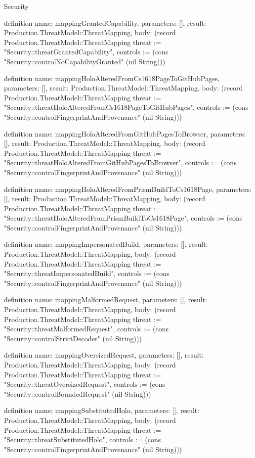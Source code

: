 \begin{lexlean}{Security}
\begin{semanticmodule}
definition{
  name: mappingGrantedCapability,
  parameters: [],
  result: Production.ThreatModel::ThreatMapping,
  body: (record Production.ThreatModel::ThreatMapping {threat := "Security::threatGrantedCapability", controls := (cons "Security::controlNoCapabilityGranted" (nil String))})
}

definition{
  name: mappingHoloAlteredFromCs1618PageToGitHubPages,
  parameters: [],
  result: Production.ThreatModel::ThreatMapping,
  body: (record Production.ThreatModel::ThreatMapping {threat := "Security::threatHoloAlteredFromCs1618PageToGitHubPages", controls := (cons "Security::controlFingerprintAndProvenance" (nil String))})
}

definition{
  name: mappingHoloAlteredFromGitHubPagesToBrowser,
  parameters: [],
  result: Production.ThreatModel::ThreatMapping,
  body: (record Production.ThreatModel::ThreatMapping {threat := "Security::threatHoloAlteredFromGitHubPagesToBrowser", controls := (cons "Security::controlFingerprintAndProvenance" (nil String))})
}

definition{
  name: mappingHoloAlteredFromPrismBuildToCs1618Page,
  parameters: [],
  result: Production.ThreatModel::ThreatMapping,
  body: (record Production.ThreatModel::ThreatMapping {threat := "Security::threatHoloAlteredFromPrismBuildToCs1618Page", controls := (cons "Security::controlFingerprintAndProvenance" (nil String))})
}

definition{
  name: mappingImpersonatedBuild,
  parameters: [],
  result: Production.ThreatModel::ThreatMapping,
  body: (record Production.ThreatModel::ThreatMapping {threat := "Security::threatImpersonatedBuild", controls := (cons "Security::controlFingerprintAndProvenance" (nil String))})
}

definition{
  name: mappingMalformedRequest,
  parameters: [],
  result: Production.ThreatModel::ThreatMapping,
  body: (record Production.ThreatModel::ThreatMapping {threat := "Security::threatMalformedRequest", controls := (cons "Security::controlStrictDecoder" (nil String))})
}

definition{
  name: mappingOversizedRequest,
  parameters: [],
  result: Production.ThreatModel::ThreatMapping,
  body: (record Production.ThreatModel::ThreatMapping {threat := "Security::threatOversizedRequest", controls := (cons "Security::controlBoundedRequest" (nil String))})
}

definition{
  name: mappingSubstitutedHolo,
  parameters: [],
  result: Production.ThreatModel::ThreatMapping,
  body: (record Production.ThreatModel::ThreatMapping {threat := "Security::threatSubstitutedHolo", controls := (cons "Security::controlFingerprintAndProvenance" (nil String))})
}


\end{semanticmodule}
\end{lexlean}

